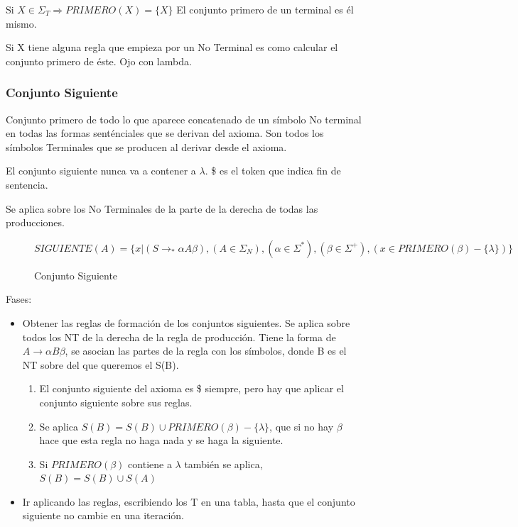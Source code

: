 \documentclass[12pt]{report} %
\begin{document}
Si \(X \in \Sigma_T \Rightarrow PRIMERO(X)=\{X\}\) El conjunto primero
de un terminal es él mismo.

Si X tiene alguna regla que empieza por un No Terminal es como calcular
el conjunto primero de éste. Ojo con lambda.


\subsubsection{Conjunto Siguiente}

Conjunto primero de todo lo que aparece concatenado de un símbolo No
terminal en todas las formas senténciales que se derivan del axioma. Son
todos los símbolos Terminales que se producen al derivar desde el
axioma.

El conjunto siguiente nunca va a contener a \(\lambda\). \$ es el token
que indica fin de sentencia.

Se aplica sobre los No Terminales de la parte de la derecha de todas las
producciones. 
\begin{figure}[H]
  $SIGUIENTE(A)=\{ x | (S \rightarrow _*\alpha A \beta), (A \in \Sigma_N), (\alpha \in \Sigma^*), (\beta \in \Sigma^+),(x\in PRIMERO(\beta)-\{\lambda\})\}$

  \captionsetup{justification=centering}
  \caption{Conjunto Siguiente}
\end{figure}
Fases:

\begin{itemize}

\item
  Obtener las reglas de formación de los conjuntos siguientes. Se aplica
  sobre todos los NT de la derecha de la regla de producción. Tiene la
  forma de \(A \rightarrow \alpha B \beta\), se asocian las partes de la
  regla con los símbolos, donde B es el NT sobre del que queremos el
  S(B).

\begin{enumerate}
\def\labelenumi{\arabic{enumi}.}
\item
  El conjunto siguiente del axioma es \$ siempre, pero hay que aplicar
  el conjunto siguiente sobre sus reglas.
\item
  Se aplica \(S(B)=S(B)\cup PRIMERO(\beta)-\{\lambda\}\), que si no hay
  \(\beta\) hace que esta regla no haga nada y se haga la siguiente.
\item
  Si \(PRIMERO(\beta)\) contiene a \(\lambda\) también se aplica,
  \(S(B)=S(B)\cup S(A)\)
\end{enumerate}


\item
  Ir aplicando las reglas, escribiendo los T en una tabla, hasta que el
  conjunto siguiente no cambie en una iteración.
\end{itemize}
\end{document}
